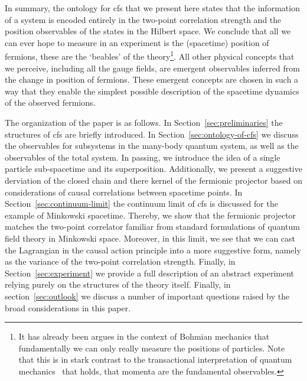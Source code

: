 \documentclass[reqno,11pt]{amsart}
\numberwithin{equation}{section}
\begin{document}
In summary, the ontology for \ac{cfs} that we present here states that the information of a system is encoded entirely in the two-point correlation strength and the
position observables of the states in the Hilbert space. 
We conclude that all we can ever hope to measure in an experiment is the (spacetime) position of fermions, these are the
`beables' of the theory\footnote{It has already been argues in the context of Bohmian mechanics that fundamentally we can only really measure the positions of particles\cite{esfeld2014ontology,gisin2018bohmian,lazarovici2020position}. Note that this is in stark contrast to the transactional interpretation of quantum mechanics~\cite{kastner2022transactional} that holds, that momenta are the fundamental observables.}.
All other physical concepts that we perceive, including all the gauge fields, are emergent observables inferred from the
change in position of fermions.
These emergent concepts are chosen in such a way that they enable the simplest possible description of the spacetime dynamics
of the observed fermions.

The organization of the paper is as follows.
In Section~\ref{sec:preliminaries} the structures of \ac{cfs} are briefly introduced.
In Section~\ref{sec:ontology-of-cfs} we discuss the observables for subsystems in the many-body quantum system, as well as the
observables of the total system.
In passing, we introduce the idea of a single particle sub-spacetime and its superposition.
Additionally, we present a suggestive derviation of the closed chain and there kernel of the fermionic projector based
on considerations of causal correlations between spacetime points.
In Section~\ref{sec:continuum-limit} the continuum limit of \ac{cfs} is discussed for the example of Minkowski spacetime.
Thereby, we show that the fermionic projector matches the two-point correlator familiar from standard formulations of quantum field theory in Minkowski space.
Moreover, in this limit, we see that we can cast the Lagrangian in the causal action principle into a more suggestive form, namely as the variance of the two-point correlation strength. 
Finally, in Section~\ref{sec:experiment} we provide a full description of an abstract experiment relying purely on the structures of the theory itself.
Finally, in section~\ref{sec:outlook} we discuss a number of important questions raised by the broad considerations in this paper. 







    
\end{document}
